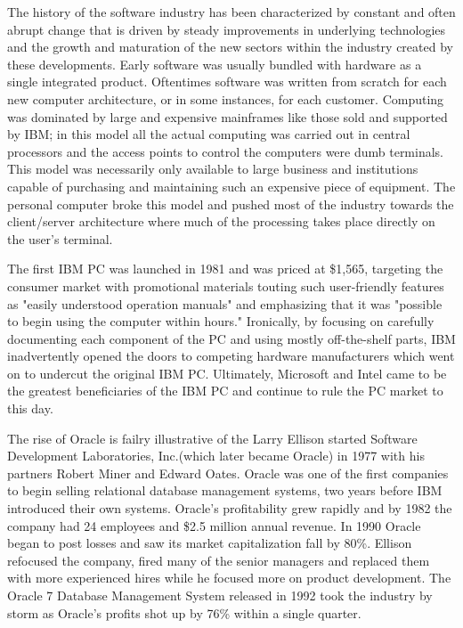 The history of the software industry has been characterized by constant and often abrupt change that is driven by steady improvements in underlying technologies and the growth and maturation of the new sectors within the industry created by these developments. Early software was usually bundled with hardware as a single integrated product.\autocite[4]{buxmann2012software}
Oftentimes software was written from scratch for each new computer architecture, or in some instances, for each customer.\autocite{MainframesStillAround}
Computing was dominated by large and expensive mainframes like those sold and supported by IBM; in this model all the actual computing was carried out in central processors and the access points to control the computers were dumb terminals.\autocite[]{LargeParadigmShiftCloudComputing}
This model was necessarily only available to large business and institutions capable of purchasing and maintaining such an expensive piece of equipment.
The personal computer broke this model and pushed most of the industry towards the client/server architecture where much of the processing takes place directly on the user's terminal.\autocite[]{LargeParadigmShiftCloudComputing}

The first IBM PC was launched in 1981 and was priced at \$1,565, targeting the consumer market with promotional materials touting such user-friendly features as "easily understood operation manuals" and emphasizing that it was "possible to begin using the computer within hours."\autocite{PCBirthday}
Ironically, by focusing on carefully documenting each component of the PC and using mostly off-the-shelf parts, IBM inadvertently opened the doors to competing hardware manufacturers which went on to undercut the original IBM PC.\autocite{PCBirthday}
Ultimately, Microsoft and Intel came to be the greatest beneficiaries of the IBM PC and continue to rule the PC market to this day.\autocite{PCBirthday}

The rise of Oracle is failry illustrative of the 
Larry Ellison started Software Development Laboratories, Inc.(which later became Oracle) in 1977 with his partners Robert Miner and Edward Oates.\autocite[113]{finkle2012larry}
Oracle was one of the first companies to begin selling relational database management systems, two years before IBM introduced their own systems.\autocite[113]{finkle2012larry}
Oracle's profitability grew rapidly and by 1982 the company had 24 employees and \$2.5 million annual revenue.
In 1990 Oracle began to post losses and saw its market capitalization fall by 80\%.\autocite[113]{finkle2012larry}
Ellison refocused the company, fired many of the senior managers and replaced them with more experienced hires while he focused more on product development.\autocite[113]{finkle2012larry}
The Oracle 7 Database Management System released in 1992 took the industry by storm as Oracle's profits shot up by 76\% within a single quarter.\autocite[114]{finkle2012larry}

